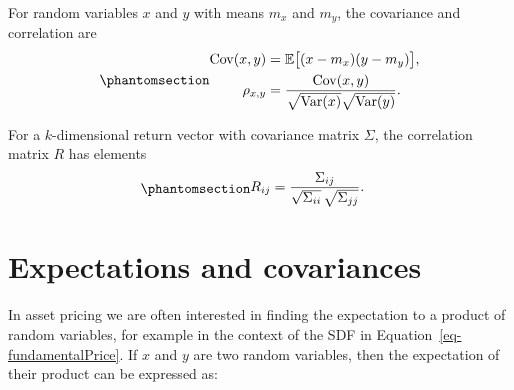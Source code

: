 \documentclass[
  letterpaper,
  DIV=11,
  numbers=noendperiod]{scrreprt}
\begin{document}
\begin{tcolorbox}[enhanced jigsaw, arc=.35mm, bottomrule=.15mm, bottomtitle=1mm, breakable, colback=white, colbacktitle=quarto-callout-note-color!10!white, colframe=quarto-callout-note-color-frame, coltitle=black, left=2mm, leftrule=.75mm, opacityback=0, opacitybacktitle=0.6, rightrule=.15mm, title=\textcolor{quarto-callout-note-color}{\faInfo}\hspace{0.5em}{Note}, titlerule=0mm, toprule=.15mm, toptitle=1mm]

For random variables \(x\) and \(y\) with means \(m_x\) and \(m_y\), the
covariance and correlation are
\begin{equation}\protect\phantomsection\label{eq-gen-0083}{  
\begin{align}
    \mathrm{Cov}(x,y)
    &= \mathbb{E}\big[(x - m_x)(y - m_y)\big],\\
    \rho_{x,y}
    &= \frac{\mathrm{Cov}(x,y)}
             {\sqrt{\mathrm{Var}(x)}\sqrt{\mathrm{Var}(y)}}.
\end{align}
}\end{equation}

For a \(k\)-dimensional return vector with covariance matrix \(\Sigma\),
the correlation matrix \(R\) has elements
\begin{equation}\protect\phantomsection\label{eq-gen-0084}{  
\begin{align}
    R_{ij} &= \frac{\Sigma_{ij}}
                    {\sqrt{\Sigma_{ii}}\,\sqrt{\Sigma_{jj}}}.
\end{align}
}\end{equation}

\end{tcolorbox}

\section*{Expectations and
covariances}\label{expectations-and-covariances}


In asset pricing we are often interested in finding the expectation to a
product of random variables, for example in the context of the SDF in
Equation~\ref{eq-fundamentalPrice}. If \(x\) and \(y\) are two random
variables, then the expectation of their product can be expressed as:
\end{document}
